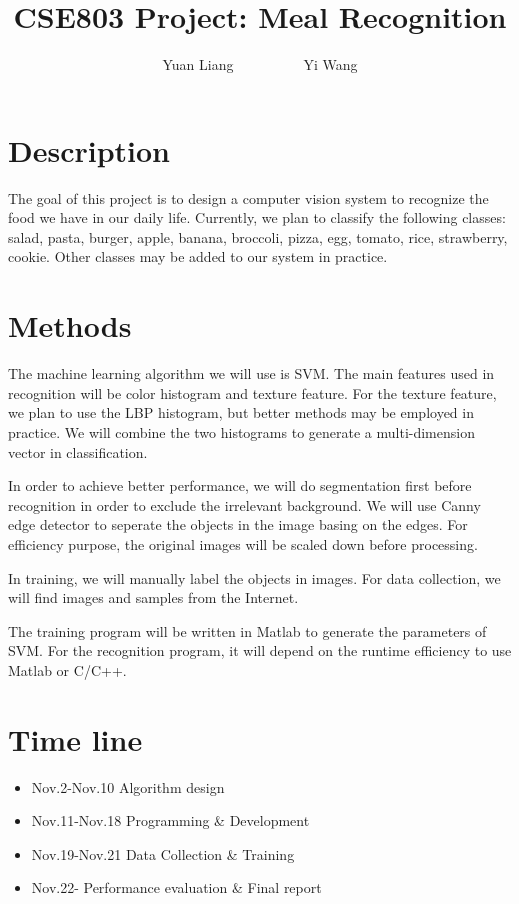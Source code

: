 \documentclass{article}
\begin{document}
\title{CSE803 Project: Meal Recognition}
\author{Yuan Liang\ \ \ \ \ \ \ \ \ \ Yi Wang}
\date{}
\maketitle
\section*{Description}
The goal of this project is to design a computer vision system to recognize the food we have in our daily life. Currently, we plan to classify the following classes: salad, pasta, burger, apple, banana, broccoli, pizza, egg, tomato, rice, strawberry, cookie. Other classes may be added to our system in practice.
\section*{Methods}
The machine learning algorithm we will use is SVM. The main features used in recognition will be color histogram and texture feature. For the texture feature, we plan to use the LBP histogram, but better methods may be employed in practice. We will combine the two histograms to generate a multi-dimension vector in classification.

In order to achieve better performance, we will do segmentation first before recognition in order to exclude the irrelevant background. We will use Canny edge detector to seperate the objects in the image basing on the edges. For efficiency purpose, the original images will be scaled down before processing. 

In training, we will manually label the objects in images. For data collection, we will find images and samples from the Internet.

The training program will be written in Matlab to generate the parameters of SVM. For the recognition program, it will depend on the runtime efficiency to use Matlab or C/C++.
\section*{Time line}
\begin{itemize}
	\item Nov.2-Nov.10  Algorithm design
	\item Nov.11-Nov.18 Programming \& Development
	\item Nov.19-Nov.21 Data Collection \& Training
	\item Nov.22-       Performance evaluation \& Final report
	
\end{itemize}    
\end{document}
